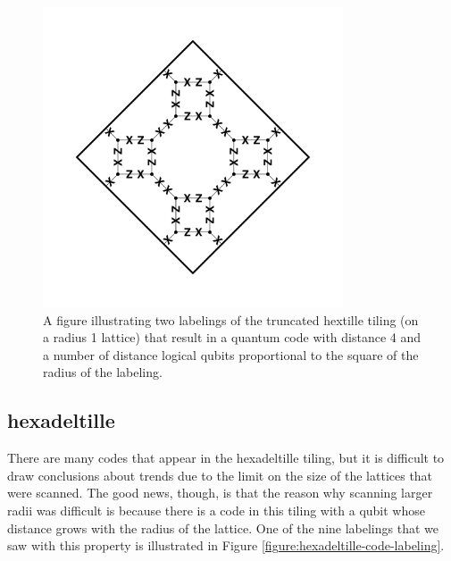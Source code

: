 \documentclass{amsbook}
\theoremstyle{plain}
\theoremstyle{definition}
\theoremstyle{remark}
\begin{document}
\begin{figure}
\includegraphics[width=3.5in]{images/truncated-quadrille-code-4-labeling-1} %
\caption{
\label{figure:truncated-hextille-code-4-labelings}
A figure illustrating two labelings of the truncated hextille tiling (on a radius 1 lattice) that result in a quantum code with distance 4 and a number of distance logical qubits proportional to the square of the radius of the labeling.
}
\end{figure}
\subsection{hexadeltille}

There are many codes that appear in the hexadeltille tiling, but it is difficult to draw conclusions about trends due to the limit on the size of the lattices that were scanned.  The good news, though, is that the reason why scanning larger radii was difficult is because there is a code in this tiling with a qubit whose distance grows with the radius of the lattice.  One of the nine labelings that we saw with this property is illustrated in Figure \ref{figure:hexadeltille-code-labeling}. 
\end{document}
